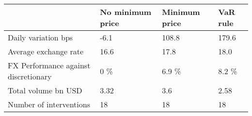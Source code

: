 \begin{tabular}{llll}
\toprule
{} & No minimum price & Minimum price & VaR rule \\
\midrule
Daily variation bps                  &             -6.1 &         108.8 &    179.6 \\
Average exchange rate                &             16.6 &          17.8 &     18.0 \\
FX Performance against discretionary &              0 \% &         6.9 \% &    8.2 \% \\
Total volume bn USD                  &             3.32 &           3.6 &     2.58 \\
Number of interventions              &               18 &            18 &       18 \\
\bottomrule
\end{tabular}
